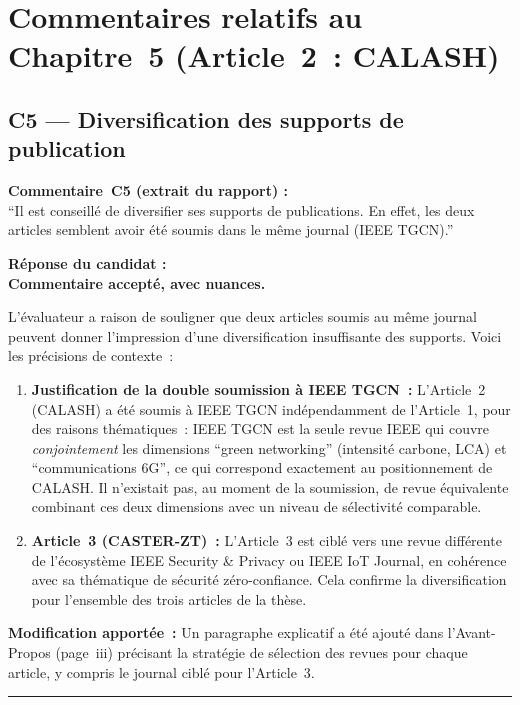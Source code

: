 \documentclass[12pt,a4paper]{article}
\newcommand{\Commentaire}[2]{%
  \begin{reviewerbox}
    \textbf{Commentaire~#1 (extrait du rapport) :}\\#2
  \end{reviewerbox}%
}
\newcommand{\Reponse}[1]{%
  \begin{responsebox}
    \textbf{Réponse du candidat :}\\#1
  \end{responsebox}%
}
\begin{document}
\section*{Commentaires relatifs au Chapitre~5 (Article~2~: CALASH)}

\subsection*{C5 --- Diversification des supports de publication}

\Commentaire{C5}{
  ``Il est conseillé de diversifier ses supports de publications. En effet, les deux articles
  semblent avoir été soumis dans le même journal (IEEE TGCN).''
}

\Reponse{
\textbf{Commentaire accepté, avec nuances.}

L'évaluateur a raison de souligner que deux articles soumis au même journal peuvent donner l'impression d'une diversification insuffisante des supports. Voici les précisions de contexte~:

\begin{enumerate}[leftmargin=*, label=(\roman*)]
  \item \textbf{Justification de la double soumission à IEEE TGCN~:} L'Article~2 (CALASH) a été soumis à IEEE TGCN indépendamment de l'Article~1, pour des raisons thématiques~: IEEE TGCN est la seule revue IEEE qui couvre \emph{conjointement} les dimensions ``green networking'' (intensité carbone, LCA) et ``communications 6G'', ce qui correspond exactement au positionnement de CALASH. Il n'existait pas, au moment de la soumission, de revue équivalente combinant ces deux dimensions avec un niveau de sélectivité comparable.
  \item \textbf{Article~3 (CASTER-ZT)~:} L'Article~3 est ciblé vers une revue différente de l'écosystème IEEE Security \& Privacy ou IEEE IoT Journal, en cohérence avec sa thématique de sécurité zéro-confiance. Cela confirme la diversification pour l'ensemble des trois articles de la thèse.
\end{enumerate}

\textbf{Modification apportée~:} Un paragraphe explicatif a été ajouté dans l'Avant-Propos (page~iii) précisant la stratégie de sélection des revues pour chaque article, y compris le journal ciblé pour l'Article~3.
}

\bigskip
\hrule
\bigskip

\end{document}
